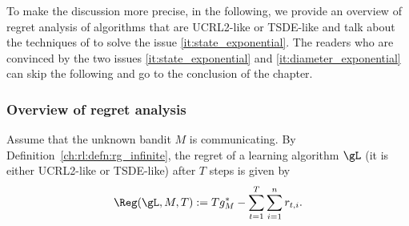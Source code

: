 To make the discussion more precise, in the following, we provide an overview of regret analysis of algorithms that are UCRL2-like or TSDE-like and talk about the techniques of \cite{ortner2012regret, jung2019thompson, akbarzadeh2022learning} to solve the issue \ref{it:state_exponential}.
The readers who are convinced by the two issues \ref{it:state_exponential} and \ref{it:diameter_exponential} can skip the following and go to the conclusion of the chapter.



\subsubsection{Overview of regret analysis}

Assume that the unknown bandit $M$ is communicating.
By Definition~\ref{ch:rl:defn:rg_infinite}, the regret of a learning algorithm $\gL$ (it is either UCRL2-like or TSDE-like) after $T$ steps is given by
\begin{align}
    \Reg(\gL,M,T) := Tg^*_M - \sum_{t=1}^{T} \sum_{i=1}^nr_{t,i}. \label{eq:regret}
\end{align}

